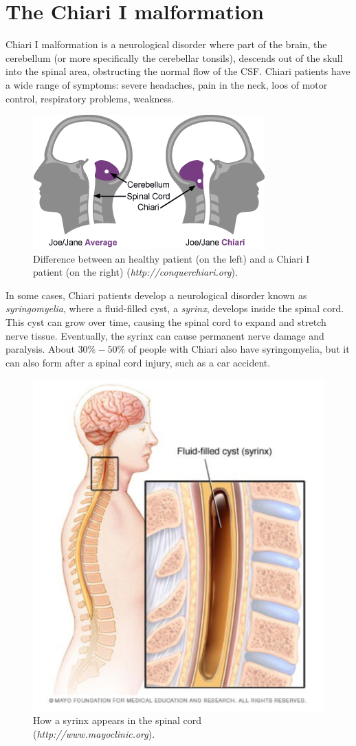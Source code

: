 \documentclass[a4paper,11pt,openright,twoside]{book}
\begin{document}
\section{The Chiari I malformation}
\label{chiariI}

Chiari I malformation is a neurological disorder where part of the brain, the cerebellum (or more specifically the cerebellar tonsils), descends out of the skull into the spinal area, obstructing the normal flow of the CSF. Chiari patients have a wide range of symptoms: severe headaches, pain in the neck, loos of motor control, respiratory problems, weakness. 

\begin{figure}[h!]
\centering
\includegraphics[width=.6\textwidth]{images/chiari}
\caption{Difference between an healthy patient (on the left) and a Chiari I patient (on the right) (\emph{http://conquerchiari.org}).}
\label{img:cns:4}
\end{figure}

In some cases, Chiari patients develop a neurological disorder known as \emph{syringomyelia}, where a fluid-filled cyst, a \emph{syrinx}, develops inside the spinal cord. This cyst can grow over time, causing the spinal cord to expand and stretch nerve tissue. Eventually, the syrinx can cause permanent nerve damage and paralysis. About $30\%-50\%$ of people with Chiari also have syringomyelia, but it can also form after a spinal cord injury, such as a car accident.

\begin{figure}[h!]
\centering
\includegraphics[width=.6\textwidth]{images/syrinx}
\caption{How a syrinx appears in the spinal cord (\emph{http://www.mayoclinic.org}).}
\label{img:cns:5}
\end{figure}
\end{document}
